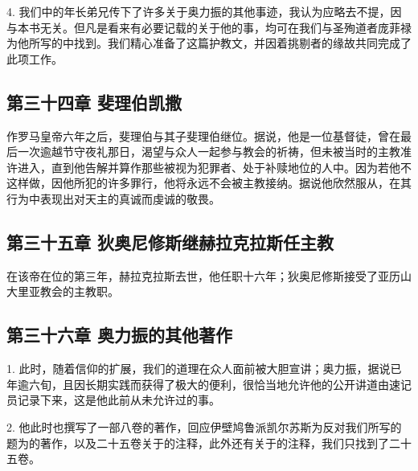 4. 我们中的年长弟兄传下了许多关于奥力振的其他事迹，我认为应略去不提，因与本书无关。但凡是看来有必要记载的关于他的事，均可在我们与圣殉道者庞菲禄为他所写的中找到。我们精心准备了这篇护教文，并因着挑剔者的缘故共同完成了此项工作。\par


\subsection{第三十四章 斐理伯凯撒}

作罗马皇帝六年之后，斐理伯与其子斐理伯继位。据说，他是一位基督徒，曾在最后一次逾越节守夜礼那日，渴望与众人一起参与教会的祈祷，但未被当时的主教准许进入，直到他告解并算作那些被视为犯罪者、处于补赎地位的人中。因为若他不这样做，因他所犯的许多罪行，他将永远不会被主教接纳。据说他欣然服从，在其行为中表现出对天主的真诚而虔诚的敬畏。\par


\subsection{第三十五章 狄奥尼修斯继赫拉克拉斯任主教}

在该帝在位的第三年，赫拉克拉斯去世，他任职十六年；狄奥尼修斯接受了亚历山大里亚教会的主教职。\par


\subsection{第三十六章 奥力振的其他著作}

1. 此时，随着信仰的扩展，我们的道理在众人面前被大胆宣讲；奥力振，据说已年逾六旬，且因长期实践而获得了极大的便利，很恰当地允许他的公开讲道由速记员记录下来，这是他此前从未允许过的事。\par

2. 他此时也撰写了一部八卷的著作，回应伊壁鸠鲁派凯尔苏斯为反对我们所写的题为的著作，以及二十五卷关于的注释，此外还有关于的注释，我们只找到了二十五卷。\par

